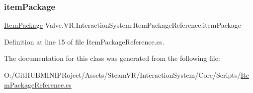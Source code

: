 \subsubsection{\texorpdfstring{itemPackage}{itemPackage}}
{\footnotesize\ttfamily \mbox{\hyperlink{class_valve_1_1_v_r_1_1_interaction_system_1_1_item_package}{Item\+Package}} Valve.\+V\+R.\+Interaction\+System.\+Item\+Package\+Reference.\+item\+Package}



Definition at line 15 of file Item\+Package\+Reference.\+cs.



The documentation for this class was generated from the following file\+:\begin{DoxyCompactItemize}
\item 
O\+:/\+Git\+H\+U\+B\+M\+I\+N\+I\+P\+Roject/\+Assets/\+Steam\+V\+R/\+Interaction\+System/\+Core/\+Scripts/\mbox{\hyperlink{_item_package_reference_8cs}{Item\+Package\+Reference.\+cs}}\end{DoxyCompactItemize}
